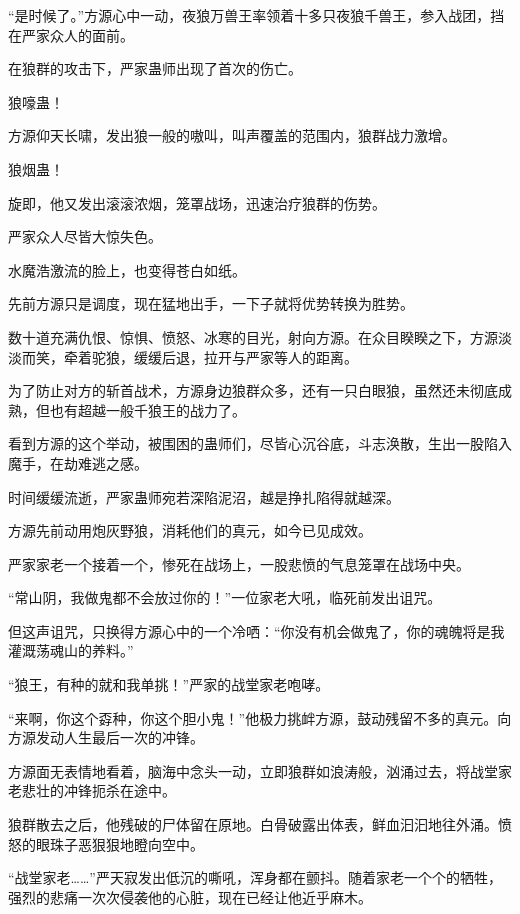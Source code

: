 
\begin{this_body}



“是时候了。”方源心中一动，夜狼万兽王率领着十多只夜狼千兽王，参入战团，挡在严家众人的面前。

在狼群的攻击下，严家蛊师出现了首次的伤亡。

狼嚎蛊！

方源仰天长啸，发出狼一般的嗷叫，叫声覆盖的范围内，狼群战力激增。

狼烟蛊！

旋即，他又发出滚滚浓烟，笼罩战场，迅速治疗狼群的伤势。

严家众人尽皆大惊失色。

水魔浩激流的脸上，也变得苍白如纸。

先前方源只是调度，现在猛地出手，一下子就将优势转换为胜势。

数十道充满仇恨、惊惧、愤怒、冰寒的目光，射向方源。在众目睽睽之下，方源淡淡而笑，牵着驼狼，缓缓后退，拉开与严家等人的距离。

为了防止对方的斩首战术，方源身边狼群众多，还有一只白眼狼，虽然还未彻底成熟，但也有超越一般千狼王的战力了。

看到方源的这个举动，被围困的蛊师们，尽皆心沉谷底，斗志涣散，生出一股陷入魔手，在劫难逃之感。

时间缓缓流逝，严家蛊师宛若深陷泥沼，越是挣扎陷得就越深。

方源先前动用炮灰野狼，消耗他们的真元，如今已见成效。

严家家老一个接着一个，惨死在战场上，一股悲愤的气息笼罩在战场中央。

“常山阴，我做鬼都不会放过你的！”一位家老大吼，临死前发出诅咒。

但这声诅咒，只换得方源心中的一个冷哂：“你没有机会做鬼了，你的魂魄将是我灌溉荡魂山的养料。”

“狼王，有种的就和我单挑！”严家的战堂家老咆哮。

“来啊，你这个孬种，你这个胆小鬼！”他极力挑衅方源，鼓动残留不多的真元。向方源发动人生最后一次的冲锋。

方源面无表情地看着，脑海中念头一动，立即狼群如浪涛般，汹涌过去，将战堂家老悲壮的冲锋扼杀在途中。

狼群散去之后，他残破的尸体留在原地。白骨破露出体表，鲜血汩汩地往外涌。愤怒的眼珠子恶狠狠地瞪向空中。

“战堂家老……”严天寂发出低沉的嘶吼，浑身都在颤抖。随着家老一个个的牺牲，强烈的悲痛一次次侵袭他的心脏，现在已经让他近乎麻木。


\end{this_body}
